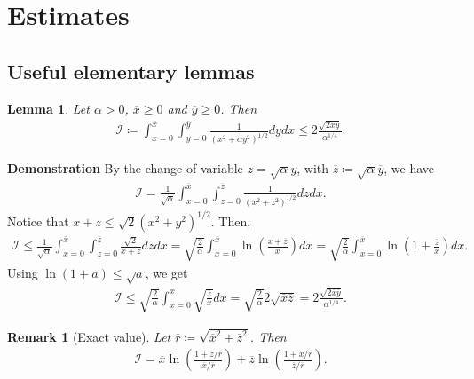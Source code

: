 \documentclass{article}
\newtheorem{remarque}{Remark}[section]
\newtheorem{lem}{Lemma}[section]
\numberwithin{equation}{section}
\newcommand{\myproof}[1]{
	\noindent \textbf{Demonstration}
	{\small	#1 \hfill \qedsymbol}
}
\newcommand{\intern}[1]{{\color{RoyalBlue} #1}} %
\begin{document}
\section{Estimates}

\subsection{Useful elementary lemmas}

\begin{lem}\label{lem:int_1surR_rectangle}
	Let $\alpha>0$, $\overline{x}\geqslant0$ and $\overline{y}\geqslant0$. Then
	\begin{align*}
		\mathcal{I} \coloneqq \int_{x=0}^{\overline{x}} \int_{y=0}^{\overline{y}} \frac{1}{\left(x^2+\alpha y^2\right)^{1/2}} dy dx \leqslant 2 \frac{\sqrt{2\overline{x} \overline{y}}}{\alpha^{1/4}}.
	\end{align*}
\end{lem}

\myproof{
	By the change of variable $z=\sqrt{\alpha} y$, with $\overline{z} \coloneqq \sqrt{\alpha} \overline{y}$, we have
	\begin{align*}
		\mathcal{I} = \frac{1}{\sqrt{\alpha}} \int_{x=0}^{\overline{x}} \int_{z=0}^{\overline{z}} \frac{1}{\left(x^2+ z^2\right)^{1/2}} dz dx.
	\end{align*}
	Notice that $x+z \leqslant \sqrt{2} \left(x^2 + y^2\right)^{1/2}$. Then, 
	\begin{align*}
		\mathcal{I} 
		\leqslant \frac{1}{\sqrt{\alpha}} \int_{x=0}^{\overline{x}} \int_{z=0}^{\overline{z}} \frac{\sqrt{2}}{x+z} dz dx 
		= \sqrt{\frac{2}{\alpha}} \int_{x=0}^{\overline{x}} \ln\left(\frac{x+\overline{z}}{x}\right) dx
		= \sqrt{\frac{2}{\alpha}} \int_{x=0}^{\overline{x}} \ln\left(1 + \frac{\overline{z}}{x}\right) dx.
	\end{align*}
	Using $\ln\left(1+a\right) \leqslant \sqrt{a}$, we get
	\begin{align*}
		\mathcal{I} 
		\leqslant \sqrt{\frac{2}{\alpha}} \int_{x=0}^{\overline{x}} \sqrt{\frac{\overline{z}}{x}} dx 
		= \sqrt{\frac{2}{\alpha}} 2 \sqrt{\overline{x} \overline{z}}
		= 2 \frac{\sqrt{2 \overline{x} \overline{y}}}{\alpha^{1/4}}.
	\end{align*}
}

\intern{
\begin{remarque}[Exact value]
	Let $\overline{r} \coloneqq \sqrt{\overline{x}^2 + \overline{z}^2}$. Then 
	\begin{align*}
		\mathcal{I} = \overline{x} \ln\left(\frac{1 + \overline{z}/\overline{r}}{\overline{x}/\overline{r}}\right) + \overline{z} \ln\left(\frac{1 + \overline{x}/\overline{r}}{\overline{z}/\overline{r}}\right).
	\end{align*}
\end{remarque}
}
\end{document}

